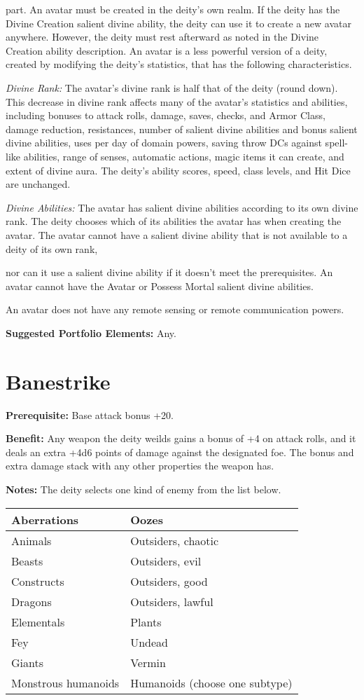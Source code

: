 \documentclass{article}
\begin{document}
part. An avatar must be created in the deity's own realm. If the deity has the 
Divine Creation salient divine ability, the deity can use it to create a new avatar 
anywhere. However, the deity must rest afterward as noted in the Divine Creation 
ability description. An avatar is a less powerful version of a deity, created by 
modifying the deity's statistics, that has the following characteristics.

\textit{Divine Rank: }The avatar's divine rank is half that of the deity (round 
down). This decrease in divine rank affects many of the avatar's statistics and 
abilities, including bonuses to attack rolls, damage, saves, checks, and Armor 
Class, damage reduction, resistances, number of salient divine abilities and bonus 
salient divine abilities, uses per day of domain powers, saving throw DCs against 
spell-like abilities, range of senses, automatic actions, magic items it can create, 
and extent of divine aura. The deity's ability scores, speed, class levels, and 
Hit Dice are unchanged.

\textit{Divine Abilities: }The avatar has salient divine abilities according to 
its own divine rank. The deity chooses which of its abilities the avatar has when 
creating the avatar. The avatar cannot have a salient divine ability that is not 
available to a deity of its own rank,

nor can it use a salient divine ability if it doesn't meet the prerequisites. An 
avatar cannot have the Avatar or Possess Mortal salient divine abilities.

An avatar does not have any remote sensing or remote communication powers.

\textbf{Suggested Portfolio Elements:} Any.

\vspace{12pt}
\section*{Banestrike}

\textbf{Prerequisite:} Base attack bonus +20.

\textbf{Benefit:} Any weapon the deity weilds gains a bonus of +4 on attack rolls, 
and it deals an extra +4d6 points of damage against the designated foe. The bonus 
and extra damage stack with any other properties the weapon has.

\textbf{Notes:} The deity selects one kind of enemy from the list below.

\begin{tabular}{|>{\raggedright}p{88pt}|>{\raggedright}p{132pt}|}
\hline
Aberrations  & Oozes\tabularnewline
\hline
Animals  & Outsiders, chaotic\tabularnewline
\hline
Beasts  & Outsiders, evil\tabularnewline
\hline
Constructs  & Outsiders, good\tabularnewline
\hline
Dragons  & Outsiders, lawful\tabularnewline
\hline
Elementals & Plants\tabularnewline
\hline
Fey  & Undead\tabularnewline
\hline
Giants  & Vermin\tabularnewline
\hline
Monstrous humanoids & Humanoids (choose one subtype)\tabularnewline
\hline
\end{tabular}
\end{document}
